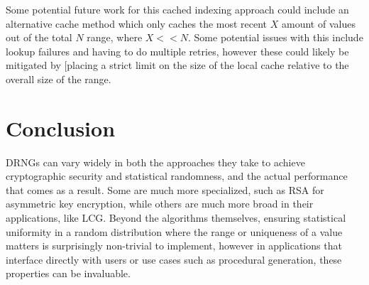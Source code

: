 \documentclass[12pt,letter,notitlepage]{article}
\begin{document}
Some potential future work for this cached indexing approach could include an alternative cache method which only caches the most recent $X$ amount of values out of the total $N$ range, where $X << N$. Some potential issues with this include lookup failures and having to do multiple retries, however these could likely be mitigated by [placing a strict limit on the size of the local cache relative to the overall size of the range.

\section{Conclusion}

DRNGs can vary widely in both the approaches they take to achieve cryptographic security and statistical randomness, and the actual performance that comes as a result. Some are much more specialized, such as RSA for asymmetric key encryption, while others are much more broad in their applications, like LCG. Beyond the algorithms themselves, ensuring statistical uniformity in a random distribution where the range or uniqueness of a value matters is surprisingly non-trivial to implement, however in applications that interface directly with users or use cases such as procedural generation, these properties can be invaluable.
\end{document}
